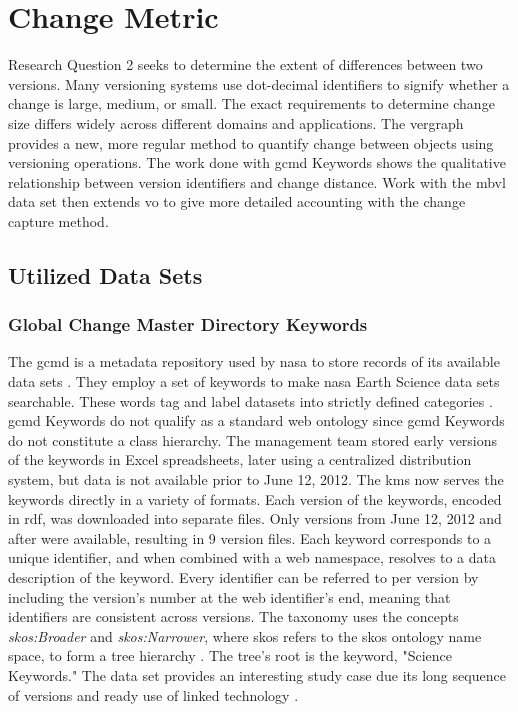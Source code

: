 \section{Change Metric} \label{ch:distance}

Research Question 2 seeks to determine the extent of differences between two \glspl{version}.
Many versioning systems use dot-decimal identifiers to signify whether a change is large, medium, or small.
The exact requirements to determine change size differs widely across different domains and applications.
The \gls{vergraph} provides a new, more regular method to quantify change between objects using versioning operations.
The work done with \gls{gcmd} Keywords shows the qualitative relationship between version identifiers and change distance.
Work with the \gls{mbvl} data set then extends \gls{vo} to give more detailed accounting with the change capture method.

\subsection{Utilized Data Sets}

\subsubsection{Global Change Master Directory Keywords}

The \gls{gcmd} is a metadata repository used by \gls{nasa} to store records of its available data sets \cite{Miled:2001:GCM:372202.372324}.
They employ a set of keywords to make \gls{nasa} Earth Science data sets searchable.
These words tag and label datasets into strictly defined categories \cite{GCMDKey}.
\gls{gcmd} Keywords do not qualify as a standard web ontology since \gls{gcmd} Keywords do not constitute a class hierarchy.
The management team stored early versions of the keywords in Excel spreadsheets, later using a centralized distribution system, but data is not available prior to June 12, 2012.
The \gls{kms} now serves the keywords directly in a variety of formats.
Each version of the keywords, encoded in \gls{rdf}, was downloaded into separate files.
Only versions from June 12, 2012 and after were available, resulting in 9 version files.
Each keyword corresponds to a unique identifier, and when combined with a web namespace, resolves to a data description of the keyword.
Every identifier can be referred to per version by including the version's number at the web identifier's end, meaning that identifiers are consistent across versions.
The taxonomy uses the concepts \textit{skos:Broader} and \textit{skos:Narrower}, where skos refers to the \gls{skos} ontology name space, to form a tree hierarchy \cite{skos}.
The tree's root is the keyword, "Science Keywords."
The data set provides an interesting study case due its long sequence of versions and ready use of \gls{linked} technology \cite{Stevens2016}.

